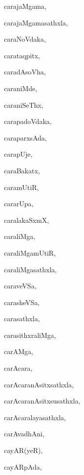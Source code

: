 \begin{multicols}{3}
{\noindent
{carajaMgama}, \pageref{carajaMgama}

\noindent
{carajaMgamasathxla}, \pageref{carajaMgamasathxla}

\noindent
{caraNoVdaka}, \pageref{caraNoVdaka}

\noindent
{carataqpitx}, \pageref{carataqpitx}

\noindent
{caradAsoVha}, \pageref{caradAsoVha}

\noindent
{caraniMde}, \pageref{caraniMde}

\noindent
{caraniSeThx}, \pageref{caraniSeThx}

\noindent
{carapadoVdaka}, \pageref{carapadoVdaka}

\noindent
{caraparxsAda}, \pageref{caraparxsAda}

\noindent
{carapUje}, \pageref{carapUje}

\noindent
{caraBakatx}, \pageref{caraBakatx}

\noindent
{caramUtiR}, \pageref{caramUtiR}

\noindent
{cararUpa}, \pageref{cararUpa}

\noindent
{caralakaSxmX}, \pageref{caralakaSxmX}

\noindent
{caraliMga}, \pageref{caraliMga}

\noindent
{caraliMgamUtiR}, \pageref{caraliMgamUtiR}

\noindent
{caraliMgasathxla}, \pageref{caraliMgasathxla}

\noindent
{caraveVSa}, \pageref{caraveVSa}

\noindent
{carasheVSa}, \pageref{carasheVSa}

\noindent
{carasathxla}, \pageref{carasathxla}

\noindent
{carasithxraliMga}, \pageref{carasithxraliMga}

\noindent
{carAMga}, \pageref{carAMga}

\noindent
{carAcara}, \pageref{carAcara}

\noindent
{carAcaranAsitxsathxla}, \pageref{carAcaranAsitxsathxla}

\noindent
{carAcaranAsitxsusathxla}, \pageref{carAcaranAsitxsusathxla}

\noindent
{carAcaralayasathxla}, \pageref{carAcaralayasathxla}

\noindent
{carAvadhAni}, \pageref{carAvadhAni}

\noindent
{cayAR(yeR)}, \pageref{cayAR(yeR)}

\noindent
{cayARpAda}, \pageref{cayARpAda}

}
\end{multicols}
